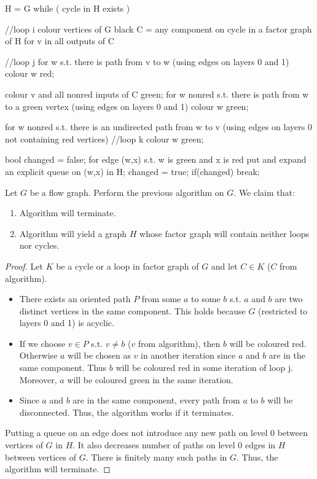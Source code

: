 \begin{samepage}
\begin{code}
  H = G
while ( cycle in H exists )     
{ //loop i
  colour vertices of G black
  C = any component on cycle in a factor graph of H
  for v in all outputs of C     
  { //loop j
    for w s.t. there is path from v to w 
    (using edges on layers 0 and 1)
    {
      colour w red;
    }

    colour v and all nonred inputs of C green;
    for w nonred s.t. there is path from w to a green vertex
    (using edges on layers 0 and 1)
    {
      colour w green;
    }

    for w nonred s.t. there is an undirected path from w to v
    (using edges on layers 0 not containing red vertices)
    { //loop k
      colour w green;
    }

    bool changed = false;
    for edge (w,x) s.t. w is green and x is red
    {
      put and expand an explicit queue on (w,x) in H;
      changed = true;
    }
    if(changed)
      break;
  }
}
\end{code}
\end{samepage}

\begin{claim}
  Let $G$ be a flow graph. Perform the previous algorithm on $G$. We claim that:
  \begin{enumerate}
    \item Algorithm will terminate.
    \item Algorithm will yield a graph $H$ whose factor graph will contain neither loops nor cycles.
  \end{enumerate}
  \begin{proof}
    Let $K$ be a cycle or a loop in factor graph of $G$ and let $C \in K$ ($C$ from algorithm).
    \begin{itemize}
      \item There exists an oriented path $P$ from some $a$ to some $b$ s.t. $a$ and $b$ are two distinct vertices in the same component. This holds because $G$ (restricted to layers 0 and 1) is acyclic.
      \item If we choose $v \in P$ s.t. $v \neq b$ ($v$ from algorithm), then $b$ will be coloured red. Otherwise $a$ will be chosen as $v$ in another iteration since $a$ and $b$ are in the same component. Thus $b$ will be coloured red in some iteration of loop j.  Moreover, $a$ will be coloured green in the same iteration.
      \item Since $a$ and $b$ are in the same component, every path from $a$ to $b$ will be disconnected. Thus, the algorithm works if it terminates. 
    \end{itemize}
      Putting a queue on an edge does not introduce any new path on level 0 between vertices of $G$ in $H$. It also decreases number of paths on level 0 edges in $H$ between vertices of $G$. There is finitely many such paths in $G$. Thus, the algorithm will terminate.
  \end{proof}
\end{claim}

